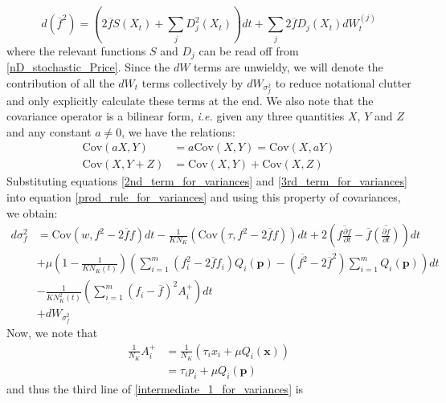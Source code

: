 \begin{equation}
\label{3rd_term_for_variances}
d(\overline{f}^2) = \left(2\overline{f}S(X_t) + \sum\limits_{j}D_j^2(X_t)\right)dt + \sum\limits_{j}2\overline{f}D_j(X_t)dW^{(j)}_t
\end{equation}
where the relevant functions $S$ and $D_j$ can be read off from \eqref{nD_stochastic_Price}. Since the $dW$ terms are unwieldy, we will denote the contribution of all the $dW_t$ terms collectively by $dW_{\sigma^2_{f}}$ to reduce notational clutter and only explicitly calculate these terms at the end. We also note that the covariance operator is a bilinear form, \emph{i.e.} given any three quantities $X$, $Y$ and $Z$ and any constant $a \neq 0$, we have the relations:
\begin{align*}
\textrm{Cov}(aX,Y) &= a\textrm{Cov}(X,Y) = \textrm{Cov}(X,aY)\\
\textrm{Cov}(X,Y+Z) &= \textrm{Cov}(X,Y)+\textrm{Cov}(X,Z)
\end{align*}
Substituting equations \eqref{2nd_term_for_variances} and \eqref{3rd_term_for_variances} into equation \eqref{prod_rule_for_variances} and using this property of covariances, we obtain:
\begin{equation}
\label{intermediate_1_for_variances}
\begin{aligned}
d\sigma^2_{f} &= \textrm{Cov}(w,f^2 - 2\overline{f}f)dt - \frac{1}{KN_K}\left(\textrm{Cov}(\tau,f^2 - 2\overline{f}f)\right)dt + 2\left(\overline{f\frac{\partial f}{\partial t}} - \overline{f}\overline{\left(\frac{\partial f}{\partial t}\right)}\right)dt\\
&+ \mu\left(1-\frac{1}{KN_K(t)}\right)\left(\sum\limits_{i=1}^{m}(f^2_i - 2\overline{f}f_i)Q_i(\mathbf{p}) - (\overline{f^2}-2\overline{f}^2)\sum\limits_{i=1}^{m}Q_i(\mathbf{p})\right)dt\\
&- \frac{1}{KN^2_{K}(t)}\left(\sum\limits_{i=1}^{m}(f_i - \overline{f})^2A_i^+\right)dt\\
&+ dW_{\sigma^2_{f}}
\end{aligned}
\end{equation}
Now, we note that
\begin{align}
\frac{1}{N_K}A_i^+ &= \frac{1}{N_K}\left(\tau_ix_i + \mu Q_i(\mathbf{x})\right)\\
&= \tau_ip_i + \mu Q_i(\mathbf{p})
\end{align}
and thus the third line of \eqref{intermediate_1_for_variances} is
